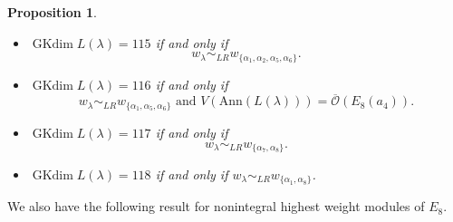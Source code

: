 \documentclass[reqno,12pt]{amsart}
\numberwithin{equation}{section}
\theoremstyle{plain}
\newtheorem{Prop}[Thm]{Proposition}
\theoremstyle{definition}
\newcommand{\lam}{\lambda}
\newcommand{\Ann}{\mathrm{Ann}}
\newcommand{\gkd}{\operatorname{GKdim}}
\begin{document}
\begin{Prop}
\begin{itemize}
        \item[(35)] $\gkd L(\lambda)=115$ if and only if $$w_{\lambda}\sim_{LR}w_{\{\alpha_1,\alpha_2,\alpha_5,\alpha_6\}}.$$
        \item[(36)] $\gkd L(\lambda)=116$ if and only if $$w_{\lambda}\sim_{LR}w_{\{\alpha_1,\alpha_5,\alpha_6\}} \text{~and~} V(\Ann (L(\lam)))=\overline{\mathcal{O}}({E}_8(a_4)).$$
        
        \item[(37)] $\gkd L(\lambda)=117$ if and only if $$w_{\lambda}\sim_{LR}w_{\{\alpha_7,\alpha_8\}}.$$ 
        \item[(38)] $\gkd L(\lambda)=118$ if and only if $w_{\lambda}\sim_{LR}w_{\{\alpha_1,\alpha_8\}}$.




      
\end{itemize}
\end{Prop}
 
We also have the following result for nonintegral highest weight modules of $E_8$.
\end{document}
